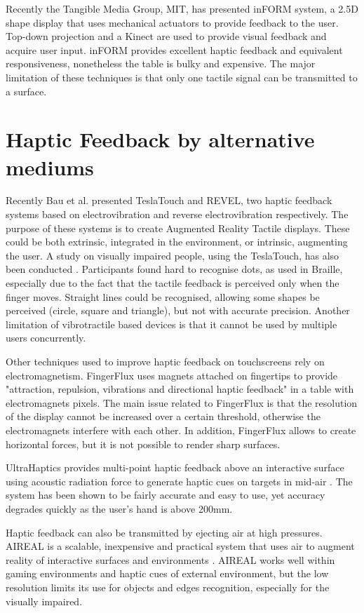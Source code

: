 Recently the Tangible Media Group, MIT, has presented inFORM system, a 2.5D shape display that uses mechanical actuators to provide feedback to the user\cite{follmer2013inform}. Top-down projection and a Kinect  are used to provide visual feedback and acquire user input. inFORM provides excellent haptic feedback and equivalent responsiveness, nonetheless the table is bulky and expensive. The major limitation of these techniques is that only one tactile signal can be transmitted to a surface. 

\section{Haptic Feedback by alternative mediums}

Recently Bau et al. presented TeslaTouch\cite{bau2010teslatouch} and REVEL\cite{bau2012revel}, two haptic feedback systems based on electrovibration and reverse electrovibration respectively. The purpose of these systems is to create Augmented Reality Tactile displays. These could be both extrinsic, integrated in the environment, or intrinsic, augmenting the user. A study on visually impaired people, using the TeslaTouch, has also been conducted \cite{xu2011tactile}. Participants found hard to recognise dots, as used in Braille, especially due to the fact that the tactile feedback is perceived only when the finger moves. Straight lines could be recognised, allowing some shapes be perceived (circle, square and triangle), but not with accurate precision. Another limitation of vibrotractile based devices is that it cannot be used by multiple users concurrently. 

Other techniques used to improve haptic feedback on touchscreens rely on electromagnetism. FingerFlux \cite{weiss2011fingerflux} uses magnets attached on fingertips to provide "attraction, repulsion, vibrations and directional haptic feedback" in a table with electromagnets pixels. The main issue related to FingerFlux is that the resolution of the display cannot be increased over a certain threshold, otherwise the electromagnets interfere with each other. In addition, FingerFlux allows to create horizontal forces, but it is not possible to render sharp surfaces.    

UltraHaptics provides multi-point haptic feedback above an interactive surface using acoustic radiation force to generate haptic cues on targets in mid-air \cite{carter2013ultrahaptics}. The system has been shown to be fairly accurate and easy to use, yet accuracy degrades quickly as the user's hand is above 200mm. 

Haptic feedback can also be transmitted by ejecting air at high pressures. AIREAL is a scalable, inexpensive and practical system that uses air to augment reality of interactive surfaces and environments \cite{sodhi2013aireal}. AIREAL works well within gaming environments and haptic cues of external environment, but the low resolution limits its use for objects and edges recognition, especially for the visually impaired.